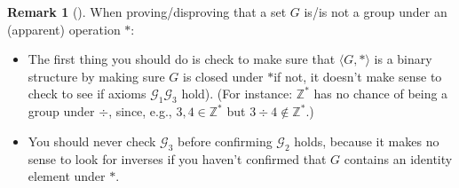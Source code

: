 \documentclass[10pt,openany,oneside]{book}
\theoremstyle{plain}
\theoremstyle{definition}
\theoremstyle{definition}
\newtheorem{remark}[theorem]{Remark}
\theoremstyle{definition}
\theoremstyle{definition}
\numberwithin{equation}{section}
\def\Z{\mathbb{Z}}
\def\G{\mathcal{G}}
\begin{document}
\begin{remark}[]\label{remark-7}
When proving/disproving that a set \(G\) is/is not a group under an (apparent) operation \(*\): \leavevmode%
\begin{itemize}[label=\textbullet]
\item{}The first thing you should do is check to make sure that  \(\langle G,*\rangle\) is a binary structure by making sure \(G\) is closed under \(*\)\textemdash{}if not, it doesn't make sense to check to see if axioms \(\G_1\)\textendash{}\(\G_3\) hold). (For instance: \(\Z^*\) has no chance of being a group under \(\div\), since, e.g., \(3,4\in \Z^*\) but \(3 \div 4 \not\in\Z^*\).)%
\item{}You should never check \(\G_3\) before confirming \(\G_2\) holds, because it makes no sense to look for inverses if you haven't confirmed that \(G\) contains an identity element under \(*\).%
\end{itemize}
%
\end{remark}
\typeout{************************************************}
\typeout{************************************************}
\end{document}

